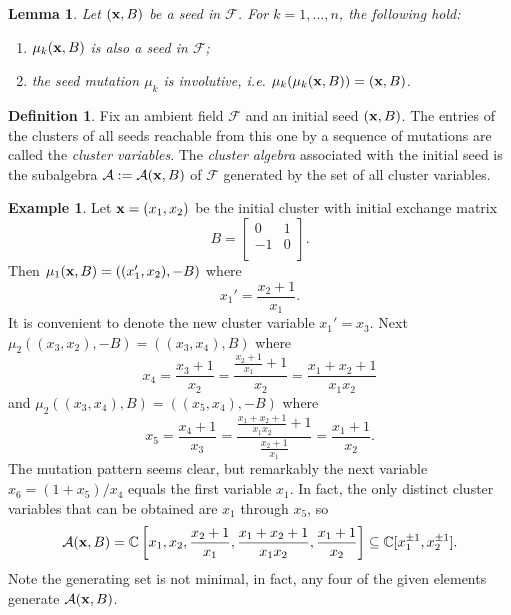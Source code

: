 \documentclass{amsart}
\newtheorem{lemma}[theorem]{Lemma}
\theoremstyle{definition}
\newtheorem{definition}[theorem]{Definition}
\newtheorem{example}[theorem]{Example}
\theoremstyle{remark}
\numberwithin{equation}{section}
\newcommand{\cA}{{\mathcal{A}}}
\newcommand{\cF}{{\mathcal{F}}}
\newcommand{\x}{{\bf x}}
\newcommand{\bx}{{\bf x}}
\newcommand{\CC}{{\mathbb{C}}}
\begin{document}
	\begin{lemma} \label{lem:mutate}
	Let $(\x,B)$ be a seed in $\cF$.  For $k=1,\ldots, n$, the following hold:
	\begin{enumerate}
		\item $\mu_k(\x,B)$ is also a seed in $\cF$;
		\item the seed mutation $\mu_k$ is involutive, i.e. $\mu_k(\mu_k(\x,B)) = (\x,B)$.
	\end{enumerate}
	\end{lemma}
	
	\begin{definition}
		Fix an ambient field $\cF$ and an initial seed $(\bx, B)$.  The entries of the clusters of all seeds reachable from this one by a sequence of mutations are called the \emph{cluster variables}.  The \emph{cluster algebra} associated with the initial seed is the subalgebra $\cA:=\cA(\bx,B)$ of $\cF$ generated by the set of all cluster variables.
	\end{definition}
	
  \begin{example}\label{example:type A2}
		Let $\x = (x_1,x_2)$ be the initial cluster with initial exchange matrix
		\begin{displaymath}
			B = \left[ \begin{array}{cc}
			0 & 1 \\
			-1 & 0 \\
			\end{array}
			\right].
		\end{displaymath}
		Then $\mu_1(\x,B) = ((x_1',x_2), -B)$ where
		\begin{displaymath}
			x_1' = \frac{x_2+1}{x_1}.
		\end{displaymath}
		It is convenient to denote the new cluster variable $x_1'=x_3$.  Next $\mu_2((x_3,x_2),-B) = ((x_3,x_4),B)$ where
		\begin{displaymath}
			x_4 = \frac{x_3+1}{x_2} = \frac{\frac{x_2+1}{x_1}+1}{x_2} = \frac{x_1 + x_2 + 1}{x_1x_2}
		\end{displaymath}
		and  $\mu_2((x_3,x_4),B) = ((x_5,x_4),-B)$ where
		\begin{displaymath}
			x_5 = \frac{x_4+1}{x_3} = \frac{\frac{x_1 + x_2 + 1}{x_1x_2}+1}{\frac{x_2+1}{x_1}} = \frac{x_1+1}{x_2}.
		\end{displaymath}
		The mutation pattern seems clear, but remarkably the next variable $x_6 = (1+x_5)/x_4$ equals the first variable $x_1$.  In fact, the only distinct cluster variables that can be obtained are $x_1$ through $x_5$, so
		\begin{displaymath}
			\cA(\x,B) = \CC\left[x_1,x_2,\frac{x_2+1}{x_1},\frac{x_1 + x_2 + 1}{x_1x_2},\frac{x_1+1}{x_2}\right] \subseteq \CC[x_1^{\pm1},x_2^{\pm1}].
		\end{displaymath}
		Note the generating set is not minimal, in fact, any four of the given elements generate $\cA(\x,B)$.
  \end{example}
	
\end{document}
